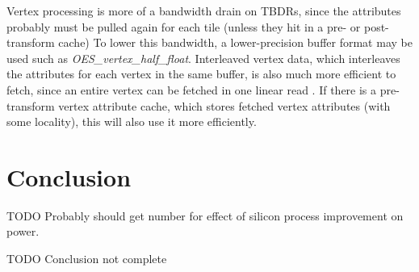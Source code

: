 Vertex processing is more of a bandwidth drain on TBDRs, since the attributes
probably must be pulled again for each tile (unless they hit in a pre- or post-
transform cache)  To lower this bandwidth, a lower-precision buffer format may
be used such as \textit{OES\_vertex\_half\_float}.  Interleaved vertex data,
which interleaves the attributes for each vertex in the same buffer, is also
much more efficient to fetch, since an entire vertex can be fetched in one
linear read \cite{Apple11}.  If there is a pre-transform vertex attribute
cache, which stores fetched vertex attributes (with some locality), this will
also use it more efficiently.  

\section{Conclusion}\label{Jon-McCaffrey-Conclusion}





TODO Probably should get number for effect of silicon process improvement on power.

TODO Conclusion not complete

 











